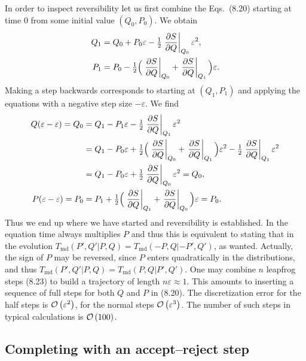 In order to inspect reversibility let us first combine the Eqs.~(8.20)
starting at time 0 from some initial value $(Q_0,P_0)$. We obtain
\begin{equation}
\begin{split}
Q_1 &= Q_0 + P_0\varepsilon - \tfrac{1}{2}\left.\frac{\partial S}{\partial Q}\right|_{Q_0}\varepsilon^2, \\
P_1 &= P_0 - \tfrac{1}{2}\Big(\left.\frac{\partial S}{\partial Q}\right|_{Q_0}
  + \left.\frac{\partial S}{\partial Q}\right|_{Q_1}\Big)\varepsilon.
\end{split}
\end{equation}
Making a step backwards corresponds to starting at $(Q_1,P_1)$ and applying
the equations with a negative step size $-\varepsilon$. We find
\begin{equation}
\begin{split}
Q(\varepsilon - \varepsilon) = Q_0 &= Q_1 - P_1\varepsilon
  - \tfrac{1}{2}\left.\frac{\partial S}{\partial Q}\right|_{Q_1}\varepsilon^2 \\
&= Q_1 - P_0\varepsilon + \tfrac{1}{2}\Big(\left.\frac{\partial S}{\partial Q}\right|_{Q_0}
  + \left.\frac{\partial S}{\partial Q}\right|_{Q_1}\Big)\varepsilon^2
  - \tfrac{1}{2}\left.\frac{\partial S}{\partial Q}\right|_{Q_1}\varepsilon^2 \\
&= Q_1 - P_0\varepsilon + \tfrac{1}{2}\left.\frac{\partial S}{\partial Q}\right|_{Q_0}\varepsilon^2
  = Q_0, \\
P(\varepsilon - \varepsilon) = P_0 &= P_1 + \tfrac{1}{2}\Big(\left.\frac{\partial S}{\partial Q}\right|_{Q_1}
  + \left.\frac{\partial S}{\partial Q}\right|_{Q_0}\Big)\varepsilon = P_0.
\end{split}
\end{equation}
Thus we end up where we have started and reversibility is established. In the
equation time always multiplies $P$ and thus this is equivalent to stating that
in the evolution $T_{\mathrm{md}}(P',Q'|P,Q) = T_{\mathrm{md}}(-P,Q|-P',Q')$, as
wanted. Actually, the sign of $P$ may be reversed, since $P$ enters quadratically
in the distributions, and thus
$T_{\mathrm{md}}(P',Q'|P,Q) = T_{\mathrm{md}}(P,Q|P',Q')$.
One may combine $n$ leapfrog steps (8.23) to build a trajectory of length
$n\varepsilon \approx 1$. This amounts to inserting a sequence of full steps
for both $Q$ and $P$ in (8.20). The discretization error for the half steps is
$\mathcal{O}\left(\varepsilon^2\right)$, for the normal steps $\mathcal{O}\left(\varepsilon^3\right)$. The
number of such steps in typical calculations is $\mathcal{O}\left(100\right)$.

\subsection{Completing with an accept--reject step}

